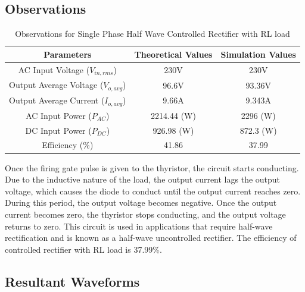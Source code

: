 \subsection{Observations}

\begin{table}[h]
    \renewcommand{\arraystretch}{1.3}
    \label{table_observation_6}
    \centering
    \begin{tabular}{|c|c|c|}
        \hline
        Parameters                              & Theoretical Values & Simulation Values \\
        \hline
        \hline
        AC Input Voltage ($ V_{in,rms} $)       & 230V               & 230V              \\
        \hline
        Output Average Voltage ($ V_{o,avg} $)  & 96.6V              & 93.36V            \\
        \hline
        Output Average Current ($ I_{o,avg}  $) & 9.66A              & 9.343A            \\
        \hline
        AC Input Power ($ P_{AC}  $)            & 2214.44 (W)        & 2296 (W)          \\
        \hline
        DC Input Power ($ P_{DC}  $)            & 926.98 (W)         & 872.3 (W)         \\
        \hline
        Efficiency (\%)                         & 41.86              & 37.99             \\
        \hline
    \end{tabular}
    \caption{Observations for Single Phase Half Wave Controlled Rectifier with RL load}

\end{table}


 Once the firing gate pulse is given to the thyristor, the circuit starts conducting. Due to the inductive nature of the load, the output current lags the output voltage, which causes the diode to conduct until the output current reaches zero. During this period, the output voltage becomes negative. Once the output current becomes zero, the thyristor stops conducting, and the output voltage returns to zero. This circuit is used in applications that require half-wave rectification and is known as a half-wave uncontrolled rectifier.
The efficiency of controlled
rectifier with RL load is 37.99\%.



\subsection{Resultant Waveforms}

